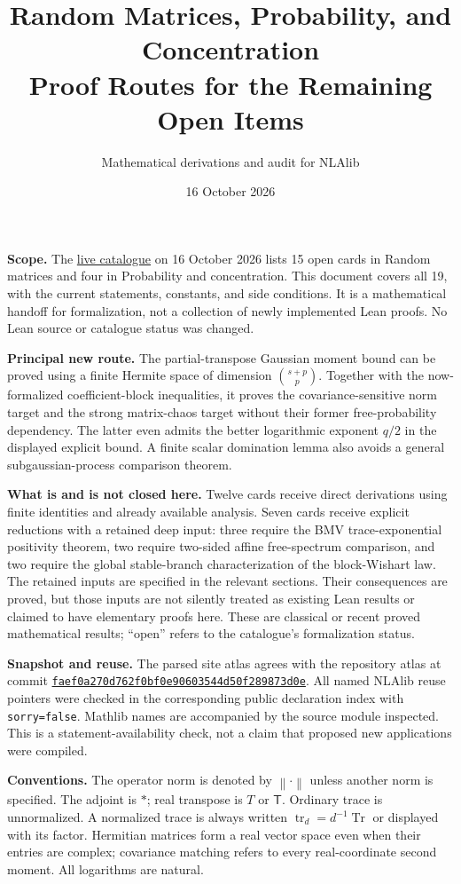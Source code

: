\documentclass[11pt,a4paper]{article}
\title{Random Matrices, Probability, and Concentration\\
Proof Routes for the Remaining Open Items}
\author{Mathematical derivations and audit for NLAlib}
\date{16 October 2026}
\newcommand{\norm}[1]{\left\lVert#1\right\rVert}
\DeclareMathOperator{\tr}{tr}
\DeclareRobustCommand{\code}[1]{{\footnotesize\urlstyle{tt}\nolinkurl{#1}}}
\begin{document}
\maketitle

\textbf{Scope.} The
\href{https://research.chen.pw/NLAlib/}{live catalogue}
on 16 October 2026 lists 15 open cards in Random matrices and four in
Probability and concentration. This document covers all 19, with the
current statements, constants, and side conditions. It is a mathematical
handoff for formalization, not a collection of newly implemented Lean proofs.
No Lean source or catalogue status was changed.

\textbf{Principal new route.} The partial-transpose Gaussian moment
bound can be proved using a finite Hermite space of dimension
$\binom{s+p}{p}$. Together with the now-formalized coefficient-block
inequalities, it proves the covariance-sensitive norm target and the
strong matrix-chaos target without their former free-probability
dependency. The latter even admits the better logarithmic exponent
$q/2$ in the displayed explicit bound. A finite scalar domination lemma
also avoids a general subgaussian-process comparison theorem.

\textbf{What is and is not closed here.} Twelve cards receive direct
derivations using finite identities and already available analysis.
Seven cards receive explicit reductions with a retained deep input:
three require the BMV trace-exponential positivity theorem, two require
two-sided affine free-spectrum comparison, and two require the global
stable-branch characterization of the block-Wishart law. The retained
inputs are specified in the relevant sections. Their consequences are
proved, but those inputs are not silently treated as existing Lean results
or claimed to have elementary proofs here. These are classical or recent
proved mathematical results; ``open'' refers to the catalogue's
formalization status.

\textbf{Snapshot and reuse.} The parsed site atlas agrees with the
repository atlas at commit
\href{https://github.com/tchen-research/NLAlib/tree/faef0a270d762f0bf0e90603544d50f289873d0e}
{\texttt{faef0a270d762f0bf0e90603544d50f289873d0e}}.
All named NLAlib reuse pointers were checked in the corresponding public
declaration index with \code{sorry=false}. Mathlib names are accompanied
by the source module inspected. This is a statement-availability check,
not a claim that proposed new applications were compiled.

\textbf{Conventions.} The operator norm is denoted by $\norm{\cdot}$ unless
another norm is specified. The adjoint is $*$; real transpose is $T$ or
$\mathsf T$. Ordinary trace is unnormalized. A normalized trace is always
written $\tr_d=d^{-1}\operatorname{Tr}$ or displayed with its factor.
Hermitian matrices form a real vector space even when their entries are
complex; covariance matching refers to every real-coordinate second
moment. All logarithms are natural.
\end{document}
